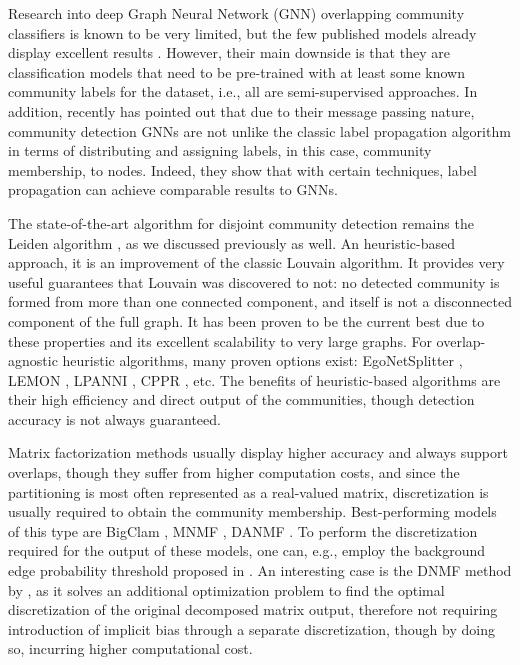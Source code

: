 Research into deep Graph Neural Network (GNN) overlapping community classifiers is known to be very limited, but the few published models already display excellent results \cite{jia_communitygan_2019, wang_unifying_2020}. However, their main downside is that they are classification models that need to be pre-trained with at least some known community labels for the dataset, i.e., all are semi-supervised approaches. In addition, recently \cite{huang_combining_2020} has pointed out that due to their message passing nature, community detection GNNs are not unlike the classic label propagation algorithm in terms of distributing and assigning labels, in this case, community membership, to nodes. Indeed, they show that with certain techniques, label propagation can achieve comparable results to GNNs.

The state-of-the-art algorithm for disjoint community detection remains the Leiden algorithm \cite{traag_louvain_2019}, as we discussed previously as well. An heuristic-based approach, it is an improvement of the classic Louvain algorithm. It provides very useful guarantees that Louvain was discovered to not: no detected community is formed from more than one connected component, and itself is not a disconnected component of the full graph. It has been proven to be the current best due to these properties and its excellent scalability to very large graphs. For overlap-agnostic heuristic algorithms, many proven options exist: EgoNetSplitter \cite{epasto_ego-splitting_2017}, LEMON \cite{li_local_2018}, LPANNI \cite{lu_lpanni_2019}, CPPR \cite{gao_overlapping_2021}, etc. The benefits of heuristic-based algorithms are their high efficiency and direct output of the communities, though detection accuracy is not always guaranteed.

Matrix factorization methods usually display higher accuracy and always support overlaps, though they suffer from higher computation costs, and since the partitioning is most often represented as a real-valued matrix, discretization is usually required to obtain the community membership. Best-performing models of this type are BigClam \cite{yang_overlapping_2013}, MNMF \cite{wang_community_2017}, DANMF \cite{ye_deep_2018}. To perform the discretization required for the output of these models, one can, e.g., employ the background edge probability threshold proposed in \cite{jia_communitygan_2019}. An interesting case is the DNMF method by \cite{ye_discrete_2019}, as it solves an additional optimization problem to find the optimal discretization of the original decomposed matrix output, therefore not requiring introduction of implicit bias through a separate discretization, though by doing so, incurring higher computational cost.

